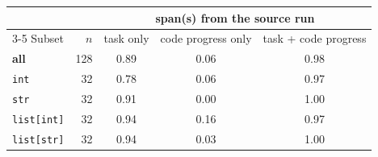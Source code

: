\begin{tabular}{l r ccc}
\toprule
 & & \multicolumn{3}{c}{span(s) from the source run} \\
\cmidrule(lr){3-5}
Subset & $n$ & task only & code progress only & task + code progress \\
\midrule
\textbf{all} & 128 & 0.89 & 0.06 & 0.98 \\
\midrule
\texttt{int} & 32 & 0.78 & 0.06 & 0.97 \\
\texttt{str} & 32 & 0.91 & 0.00 & 1.00 \\
\texttt{list[int]} & 32 & 0.94 & 0.16 & 0.97 \\
\texttt{list[str]} & 32 & 0.94 & 0.03 & 1.00 \\
\bottomrule
\end{tabular}
